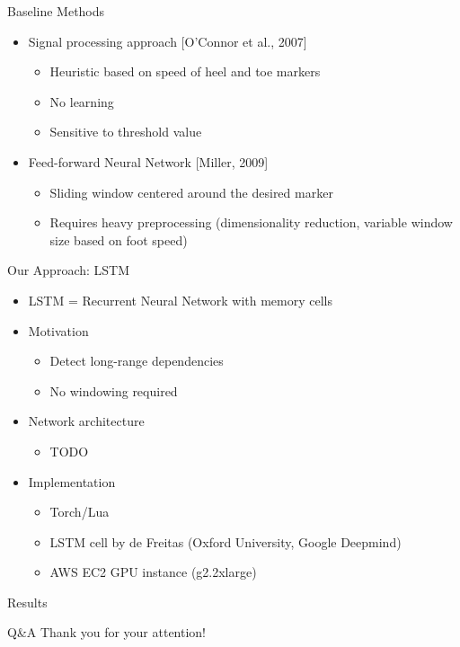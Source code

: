 \documentclass{beamer}
\begin{document}
\begin{frame}{Baseline Methods}
    \begin{itemize}
        \item
            Signal processing approach [O'Connor et al., 2007]
            \begin{itemize}
                \item
                    Heuristic based on speed of heel and toe markers
                \item
                    No learning
                \item
                    Sensitive to threshold value
            \end{itemize}
        \item
            Feed-forward Neural Network [Miller, 2009]
            \begin{itemize}
                \item
                    Sliding window centered around the desired marker
                \item
                    Requires heavy preprocessing (dimensionality reduction,
                    variable window size based on foot speed)
            \end{itemize}
    \end{itemize}
\end{frame}

\begin{frame}{Our Approach: LSTM}
    \begin{itemize}
        \item
            LSTM = Recurrent Neural Network with memory cells
        \item
            Motivation
            \begin{itemize}
            \item
                Detect long-range dependencies
            \item
                No windowing required
            \end{itemize}
        \item
            Network architecture
            \begin{itemize}
                \item TODO
            \end{itemize}
        \item
            Implementation
            \begin{itemize}
                \item
                    Torch/Lua
                \item
                    LSTM cell by
                    de Freitas (Oxford University, Google Deepmind)
                \item
                    AWS EC2 GPU instance (g2.2xlarge)
            \end{itemize}
    \end{itemize}
\end{frame}

\begin{frame}{Results}
\end{frame}

\begin{frame}{Q\&A}
    \Large
    \centering
    Thank you for your attention!
\end{frame}
\end{document}

